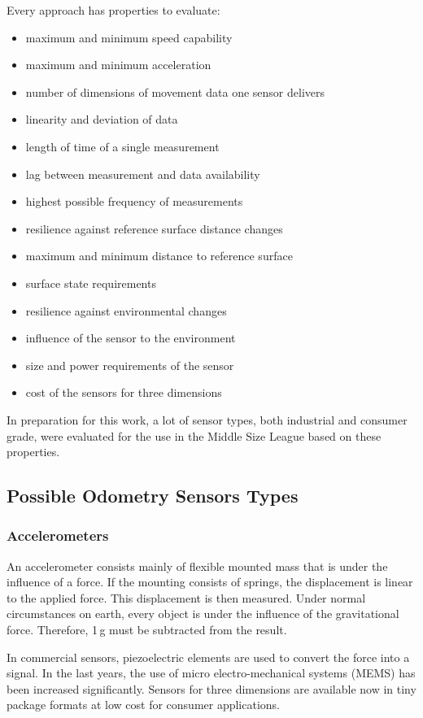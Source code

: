 \documentclass[12pt,a4paper]{article}
\newcommand{\MSL}{Middle Size League\xspace}
\begin{document}
Every approach has properties to evaluate:
\begin{itemize}
  \item maximum and minimum speed capability
  \item maximum and minimum acceleration
  \item number of dimensions of movement data one sensor delivers
  \item linearity and deviation of data
  \item length of time of a single measurement
  \item lag between measurement and data availability
  \item highest possible frequency of measurements
  \item resilience against reference surface distance changes
  \item maximum and minimum distance to reference surface
  \item surface state requirements
  \item resilience against environmental changes
  \item influence of the sensor to the environment 
  \item size and power requirements of the sensor
  \item cost of the sensors for three dimensions
\end{itemize}

In preparation for this work, a lot of sensor types, both industrial and consumer grade, were evaluated for the use in the \MSL based on these properties.


\subsection{Possible Odometry Sensors Types}



\subsubsection{Accelerometers}

An accelerometer consists mainly of flexible mounted mass that is under the influence of a force.
If the mounting consists of springs, the displacement is linear to the applied force.
This displacement is then measured.
Under normal circumstances on earth, every object is under the influence of the gravitational force.
Therefore, 1\,g must be subtracted from the result.

In commercial sensors, piezoelectric elements are used to convert the force into a signal.
In the last years, the use of micro electro-mechanical systems (MEMS) has been increased significantly.
Sensors for three dimensions are available now in tiny package formats at low cost for consumer applications.
\end{document}
